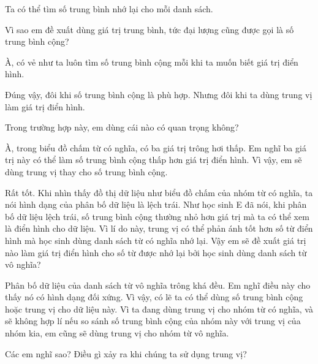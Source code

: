 {\begin{scriptlist}
      \item [Học sinh D:] Ta có thể tìm số trung bình nhớ lại cho mỗi danh sách.

      \item [Giáo viên:] Vì sao em đề xuất dùng giá trị trung bình, tức đại lượng cũng được gọi là số trung bình cộng?

      \item [Học sinh D:] À, có vẻ như ta luôn tìm số trung bình cộng mỗi khi ta muốn biết giá trị điển hình.

      \item [Học sinh E:]  Đúng vậy, đôi khi số trung bình cộng là phù hợp. Nhưng đôi khi ta dùng trung vị làm giá trị điển hình.

      \item [Giáo viên:] Trong trường hợp này, em dùng cái nào có quan trọng không?

      \item [Học sinh E:] À, trong biểu đồ chấm từ có nghĩa, có ba giá trị trông hơi thấp. Em nghĩ ba giá trị này có thể làm số trung bình cộng thấp hơn giá trị điển hình. Vì vậy, em sẽ dùng trung vị thay cho số trung bình cộng.\vspace{\baselineskip}

      \item [Giáo viên:] Rất tốt. Khi nhìn thấy đồ thị dữ liệu như biểu đồ chấm của nhóm từ có nghĩa, ta nói hình dạng của phân bố dữ liệu là lệch trái. Như học sinh E đã nói, khi phân bố dữ liệu lệch trái, số trung bình cộng thường nhỏ hơn giá trị mà ta có thể xem là điển hình cho dữ liệu. Vì lí do này, trung vị có thể phản ánh tốt hơn số từ điển hình mà học sinh dùng danh sách từ có nghĩa nhớ lại. Vậy em sẽ đề xuất giá trị nào làm giá trị điển hình cho số từ được nhớ lại bởi học sinh dùng danh sách từ vô nghĩa?\vspace{2\baselineskip}

      \item [Học sinh E:] Phân bố dữ liệu của danh sách từ vô nghĩa trông khá đều. Em nghĩ điều này cho thấy nó có hình dạng đối xứng. Vì vậy, có lẽ ta có thể dùng số trung bình cộng hoặc trung vị cho dữ liệu này. Vì ta đang dùng trung vị cho nhóm từ có nghĩa, và sẽ không hợp lí nếu so sánh số trung bình cộng của nhóm này với trung vị của nhóm kia, em cũng sẽ dùng trung vị cho nhóm từ vô nghĩa.\vspace{\baselineskip}

      \item [Giáo viên:] Các em nghĩ sao? Điều gì xảy ra khi chúng ta sử dụng trung vị?


\end{scriptlist}}
